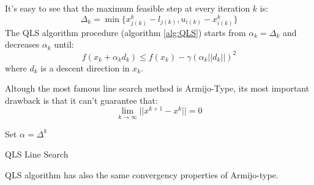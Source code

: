 It's easy to see that the maximum feasible step at every iteration $k$ is:
\begin{equation}
\Delta_k= \min \{ x^k_{j(k)}-l_{j(k)}, u_{i(k)}-x^k_{i(k)}\}
\end{equation}
The QLS algorithm procedure (algorithm \ref{alg:QLS}) starts from $\alpha_k = \Delta_k$ and decreases $\alpha_k$ until:
\begin{equation}
f(x_k+\alpha_kd_k) \le  f(x_k)- \gamma (\alpha_k||d_k||)^2
\end{equation}
 where $d_k$ is a descent direction in $x_k$.



Altough the most famous line search method is Armijo-Type, its most important drawback is that it can't guarantee that:
\begin{equation}
 \displaystyle \lim_{k\rightarrow \infty} ||x^{k+1}-x^{k}|| =0
\end{equation}



 
 \begin{algorithm}[ht]
 Set $\alpha = \Delta^{k}$\\
 \caption{QLS Line Search}\label{alg:QLS}
\end{algorithm}

QLS algorithm has also the same convergency properties \cite{sciandrone-galligari-dilorenzo} of Armijo-type.
